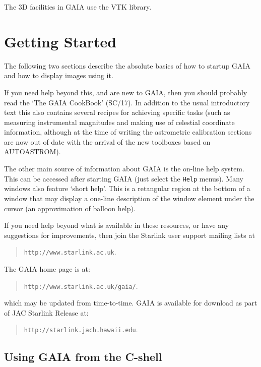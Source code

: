 \documentclass[twoside,11pt]{article}
\newcommand{\htmladdnormallink}[2]{#1}
\newcommand{\xref}[3]{#1}
\newcommand{\xlabel}[1]{}
\renewcommand{\_}{\texttt{\symbol{95}}}
\newcommand{\mytt}[1]{{\texttt{#1}}}
\begin{document}
The 3D facilities in GAIA use the
\htmladdnormallink{VTK}{http://www.kitware.com} library.

\section{\xlabel{getting_started}Getting Started}

The following two sections describe the absolute basics of how to
startup GAIA and how to display images using it.

If you need help beyond this, and are new to GAIA, then you should probably
read the `The GAIA CookBook' (\xref{SC/17}{sc17}{}). In addition to the usual
introductory text this also contains several recipes for achieving specific
tasks (such as measuring instrumental magnitudes and making use of celestial
coordinate information, although at the time of writing the astrometric
calibration sections are now out of date with the arrival of the new toolboxes
based on AUTOASTROM).

The other main source of information about GAIA is the 
\xref{on-line help system}{gaia}{regions}. 
This can be accessed after starting GAIA (just select the
\mytt{Help} menus). Many windows also feature `short help'. This is a
retangular region at the bottom of a window that may display a
one-line description of the window element under the cursor (an
approximation of balloon help).

If you need help beyond what is available in these resources, or have
any suggestions for improvements, then join the Starlink user support
mailing lists at
\begin{quote}
\htmladdnormallink{\mytt{http://www.starlink.ac.uk}}{http://www.starlink.ac.uk}.
\end{quote}
The GAIA home page is at:
\begin{quote}
\htmladdnormallink{\mytt{http://www.starlink.ac.uk/gaia/}}{http://www.starlink.ac.uk/gaia/}.
\end{quote}
which may be updated from time-to-time. GAIA is available for download
as part of JAC Starlink Release at:
\begin{quote}
\htmladdnormallink{\mytt{http://starlink.jach.hawaii.edu}}{http://starlink.jach.hawaii.edu}.
\end{quote}

\subsection{\xlabel{using_gaia_from_the_cshell}Using GAIA from the C-shell}
\end{document}
